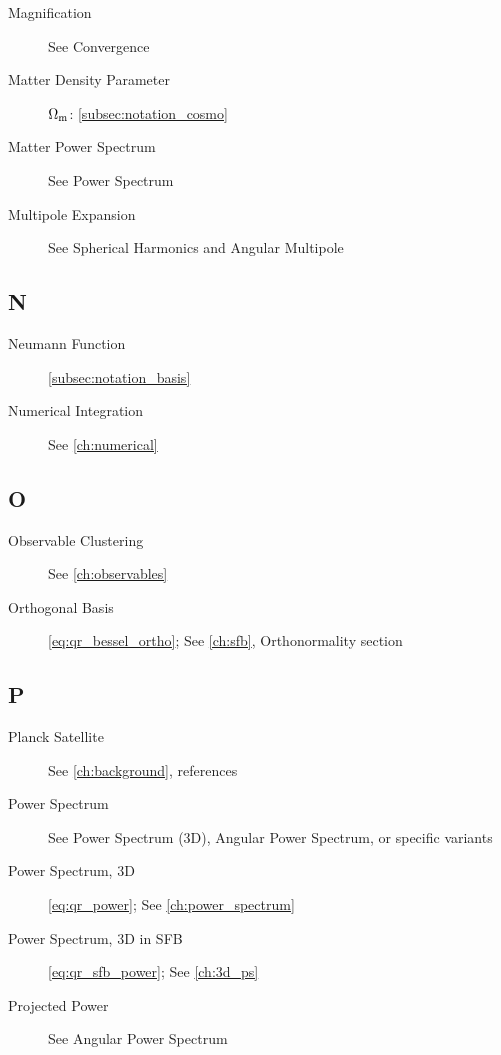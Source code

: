\begin{description}
    \item[Magnification] See Convergence
    \item[Matter Density Parameter] $\Omega_{\mathrm{m}}$: \autoref{subsec:notation_cosmo}
    \item[Matter Power Spectrum] See Power Spectrum
    \item[Multipole Expansion] See Spherical Harmonics and Angular Multipole
\end{description}

\subsection{N}\label{subsec:idx_n}

\begin{description}
    \item[Neumann Function] \autoref{subsec:notation_basis}
    \item[Numerical Integration] See \cref{ch:numerical}
\end{description}

\subsection{O}\label{subsec:idx_o}

\begin{description}
    \item[Observable Clustering] See \cref{ch:observables}
    \item[Orthogonal Basis] \autoref{eq:qr_bessel_ortho}; See \cref{ch:sfb}, Orthonormality section
\end{description}

\subsection{P}\label{subsec:idx_p}

\begin{description}
    \item[Planck Satellite] See \cref{ch:background}, references
    \item[Power Spectrum] See Power Spectrum (3D), Angular Power Spectrum, or specific variants
    \item[Power Spectrum, 3D] \autoref{eq:qr_power}; See \cref{ch:power_spectrum}
    \item[Power Spectrum, 3D in SFB] \autoref{eq:qr_sfb_power}; See \cref{ch:3d_ps}
    \item[Projected Power] See Angular Power Spectrum
\end{description}

